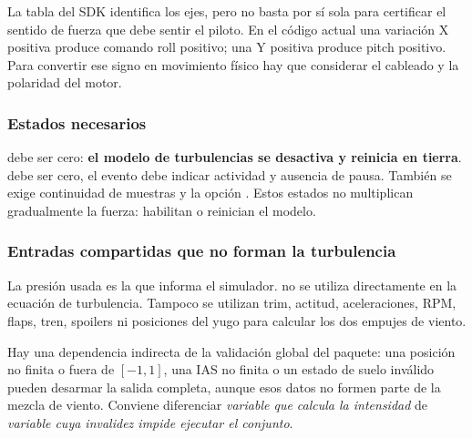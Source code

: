 La tabla del SDK identifica los ejes, pero no basta por sí sola para certificar el sentido de fuerza que debe sentir el piloto. En el código actual una variación X positiva produce comando roll positivo; una Y positiva produce pitch positivo. Para convertir ese signo en movimiento físico hay que considerar el cableado y la polaridad del motor.

\subsubsection{Estados necesarios}
 debe ser cero: \textbf{el modelo de turbulencias se desactiva y reinicia en tierra}.  debe ser cero, el evento  debe indicar actividad y  ausencia de pausa. También se exige continuidad de muestras y la opción . Estos estados no multiplican gradualmente la fuerza: habilitan o reinician el modelo.

\subsubsection{Entradas compartidas que no forman la turbulencia}
La presión usada es la que informa el simulador.  no se utiliza directamente en la ecuación de turbulencia. Tampoco se utilizan trim, actitud, aceleraciones, RPM, flaps, tren, spoilers ni posiciones del yugo para calcular los dos empujes de viento.

Hay una dependencia indirecta de la validación global del paquete: una posición  no finita o fuera de $[-1,1]$, una IAS no finita o un estado de suelo inválido pueden desarmar la salida completa, aunque esos datos no formen parte de la mezcla de viento. Conviene diferenciar \emph{variable que calcula la intensidad} de \emph{variable cuya invalidez impide ejecutar el conjunto}.


